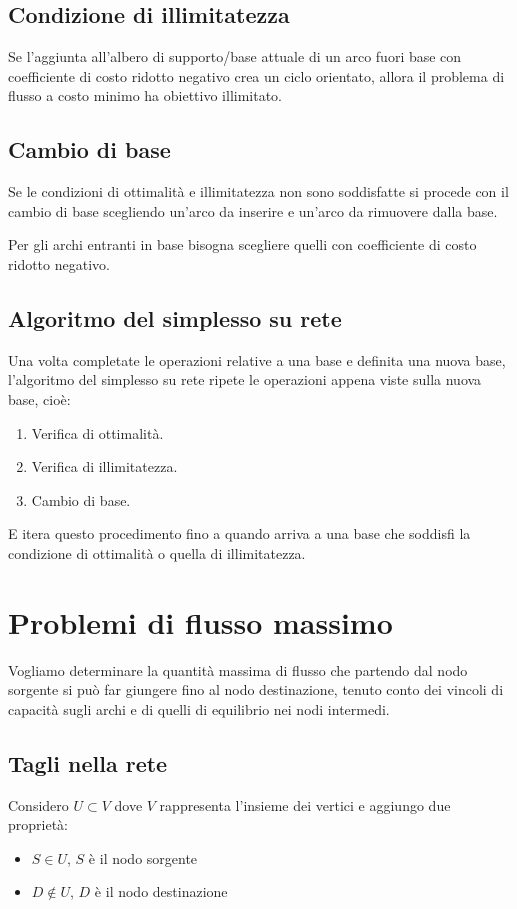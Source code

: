 \subsection{Condizione di illimitatezza}
Se l'aggiunta all'albero di supporto/base attuale di un arco fuori base con coefficiente di costo ridotto negativo crea un ciclo orientato, allora il problema di flusso a costo minimo ha obiettivo illimitato.


\subsection{Cambio di base}

Se le condizioni di ottimalit\`a e illimitatezza non sono soddisfatte si procede con il cambio di base
scegliendo un'arco da inserire e un'arco da rimuovere dalla base.

Per gli archi entranti in base bisogna scegliere quelli con coefficiente di costo ridotto negativo.

\subsection{Algoritmo del simplesso su rete}
Una volta completate le operazioni relative a una base e definita una nuova base, l'algoritmo del simplesso su rete ripete le operazioni appena viste sulla nuova base, cioè:



\begin{enumerate}
  \item Verifica di ottimalità.
  \item Verifica di illimitatezza.
  \item Cambio di base.
\end{enumerate}

E itera questo procedimento fino a quando arriva a una base che soddisfi la condizione di ottimalità o quella di illimitatezza.




\section{Problemi di flusso massimo}
Vogliamo determinare la quantità massima di flusso che
partendo dal nodo sorgente si può far giungere fino al nodo
destinazione, tenuto conto dei vincoli di capacità sugli archi
e di quelli di equilibrio nei nodi intermedi.

\subsection{Tagli nella rete}
Considero $U \subset V$ dove $V$ rappresenta l'insieme dei vertici e aggiungo due propriet\`a:
\begin{itemize}
  \item $S \in U$, $S$ \`e il nodo sorgente
  \item $D \not \in U$, $D$ \`e il nodo destinazione
\end{itemize}

